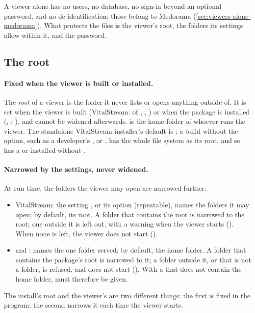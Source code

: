 A viewer alone has no users, no database, no sign-in beyond an optional password, and no
de-identification: those belong to Medorama (\cref{sec:viewers-alone-medorama}). What protects
the files is the viewer's root, the folders its settings allow within it, and the password.

\subsection{The root}
\label{sec:viewers-alone-root}

\paragraph{Fixed when the viewer is built or installed.} The \emph{root} of a viewer is the folder
it never lists or opens anything outside of. It is set when the viewer is built (VitalStream:
 of , , ) or when the
package is installed (, : ), and cannot be widened
afterwards. \code{\textasciitilde} is the home folder of whoever runs the viewer. The standalone
VitalStream installer's default is \code{\textasciitilde}; a build without the option, such as a
developer's ,  or , has the whole
file system as its root, and so has a  or  installed without
.

\paragraph{Narrowed by the settings, never widened.} At run time, the folders the viewer may
open are narrowed further:
\begin{itemize}
\item VitalStream: the setting , or its option  (repeatable),
  names the folders it may open; by default, its root. A folder that contains the root is
  narrowed to the root; one outside it is left out, with a warning when the viewer starts
  (). When none is left, the viewer does
  not start ().
\item {} and :  names the one folder
  served; by default, the home folder. A folder that contains the package's root is narrowed to
  it; a folder outside it, or that is not a folder, is refused, and  does not start
  (). With
  a  that does not contain the home folder,  must therefore be
  given.
\end{itemize}
The install's root and the viewer's  are two different things: the first is fixed
in the program, the second narrows it each time the viewer starts.

